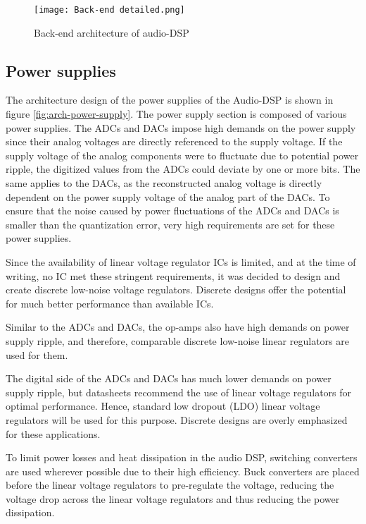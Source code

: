 \begin{figure}[ht]
    \texttt{[image: Back-end detailed.png]}\\    
    \caption{Back-end architecture of audio-DSP}
    \label{fig:arch-back-end}
\end{figure}

\subsection{Power supplies}
The architecture design of the power supplies of the Audio-DSP is shown in figure \ref{fig:arch-power-supply}. The power supply section is composed of various power supplies. The ADCs and DACs impose high demands on the power supply since their analog voltages are directly referenced to the supply voltage. If the supply voltage of the analog components were to fluctuate due to potential power ripple, the digitized values from the ADCs could deviate by one or more bits. The same applies to the DACs, as the reconstructed analog voltage is directly dependent on the power supply voltage of the analog part of the DACs. To ensure that the noise caused by power fluctuations of the ADCs and DACs is smaller than the quantization error, very high requirements are set for these power supplies.

Since the availability of linear voltage regulator ICs is limited, and at the time of writing, no IC met these stringent requirements, it was decided to design and create discrete low-noise voltage regulators. Discrete designs offer the potential for much better performance than available ICs.

Similar to the ADCs and DACs, the op-amps also have high demands on power supply ripple, and therefore, comparable discrete low-noise linear regulators are used for them.

The digital side of the ADCs and DACs has much lower demands on power supply ripple, but datasheets recommend the use of linear voltage regulators for optimal performance. Hence, standard low dropout (LDO) linear voltage regulators will be used for this purpose. Discrete designs are overly emphasized for these applications.

To limit power losses and heat dissipation in the audio DSP, switching converters are used wherever possible due to their high efficiency. Buck converters are placed before the linear voltage regulators to pre-regulate the voltage, reducing the voltage drop across the linear voltage regulators and thus reducing the power dissipation.

